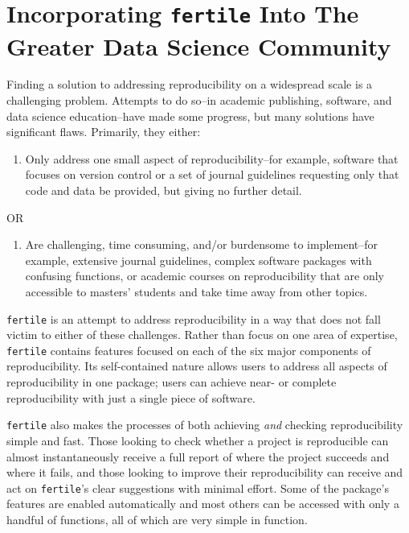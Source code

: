 \documentclass[12pt,twoside]{reedthesis}
\providecommand{\tightlist}{%
  \setlength{\itemsep}{0pt}\setlength{\parskip}{0pt}}
\begin{document}
\chapter{\texorpdfstring{Incorporating \texttt{fertile} Into The Greater
Data Science
Community}{Incorporating fertile Into The Greater Data Science Community}}\label{applications}

Finding a solution to addressing reproducibility on a widespread scale
is a challenging problem. Attempts to do so--in academic publishing,
software, and data science education--have made some progress, but many
solutions have significant flaws. Primarily, they either:
\begin{enumerate}
\def\labelenumi{\Alph{enumi})}
\tightlist
\item
  Only address one small aspect of reproducibility--for example,
  software that focuses on version control or a set of journal
  guidelines requesting only that code and data be provided, but giving
  no further detail.
\end{enumerate}
\begin{center}
OR
\end{center}
\begin{enumerate}
\def\labelenumi{\Alph{enumi})}
\setcounter{enumi}{1}
\tightlist
\item
  Are challenging, time consuming, and/or burdensome to implement--for
  example, extensive journal guidelines, complex software packages with
  confusing functions, or academic courses on reproducibility that are
  only accessible to masters' students and take time away from other
  topics.
\end{enumerate}
\texttt{fertile} is an attempt to address reproducibility in a way that
does not fall victim to either of these challenges. Rather than focus on
one area of expertise, \texttt{fertile} contains features focused on
each of the six major components of reproducibility. Its self-contained
nature allows users to address all aspects of reproducibility in one
package; users can achieve near- or complete reproducibility with just a
single piece of software.

\texttt{fertile} also makes the processes of both achieving \emph{and}
checking reproducibility simple and fast. Those looking to check whether
a project is reproducible can almost instantaneously receive a full
report of where the project succeeds and where it fails, and those
looking to improve their reproducibility can receive and act on
\texttt{fertile}'s clear suggestions with minimal effort. Some of the
package's features are enabled automatically and most others can be
accessed with only a handful of functions, all of which are very simple
in function.
\end{document}
